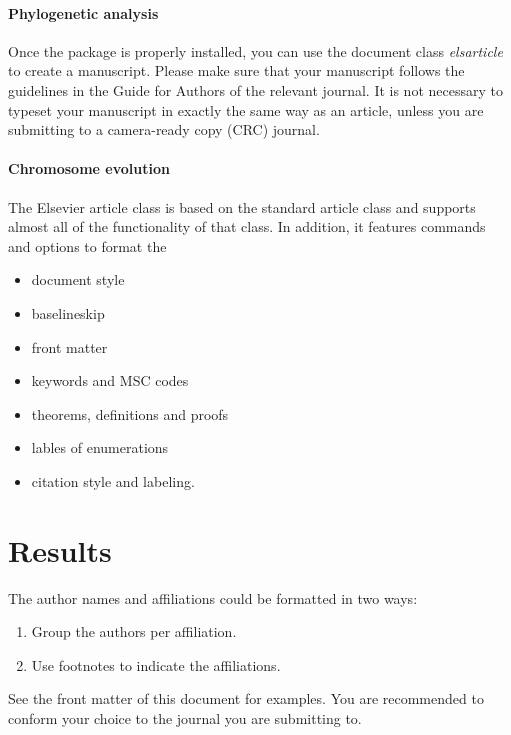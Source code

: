 \documentclass[review]{elsarticle}
\begin{document}
\paragraph{Phylogenetic analysis} Once the package is properly installed, you can use the document class \emph{elsarticle} to create a manuscript. Please make sure that your manuscript follows the guidelines in the Guide for Authors of the relevant journal. It is not necessary to typeset your manuscript in exactly the same way as an article, unless you are submitting to a camera-ready copy (CRC) journal.

\paragraph{Chromosome evolution} The Elsevier article class is based on the standard article class and supports almost all of the functionality of that class. In addition, it features commands and options to format the
\begin{itemize}
\item document style
\item baselineskip
\item front matter
\item keywords and MSC codes
\item theorems, definitions and proofs
\item lables of enumerations
\item citation style and labeling.
\end{itemize}

\section{Results}

The author names and affiliations could be formatted in two ways:
\begin{enumerate}[(1)]
\item Group the authors per affiliation.
\item Use footnotes to indicate the affiliations.
\end{enumerate}
See the front matter of this document for examples. You are recommended to conform your choice to the journal you are submitting to.
\end{document}
